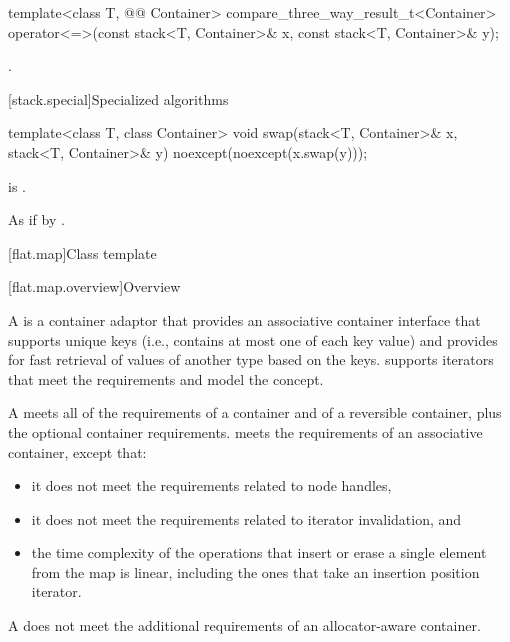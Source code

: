 %
\begin{itemdecl}
template<class T, @@ Container>
  compare_three_way_result_t<Container>
    operator<=>(const stack<T, Container>& x, const stack<T, Container>& y);
\end{itemdecl}

\begin{itemdescr}
\pnum
\returns
{}.
\end{itemdescr}

[stack.special]{Specialized algorithms}

%
\begin{itemdecl}
template<class T, class Container>
  void swap(stack<T, Container>& x, stack<T, Container>& y) noexcept(noexcept(x.swap(y)));
\end{itemdecl}

\begin{itemdescr}
\pnum
\constraints
{} is .

\pnum
\effects
As if by .
\end{itemdescr}

[flat.map]{Class template }

[flat.map.overview]{Overview}

\pnum
{}%
A  is a container adaptor
that provides an associative container interface
that supports unique keys
(i.e., contains at most one of each key value) and
provides for fast retrieval of values of another type 
based on the keys.
 supports iterators
that meet the  requirements and
model the
 concept.

\pnum
A  meets all of the requirements
of a container and
of a reversible container,
plus the optional container requirements.
 meets the requirements of
an associative container,
except that:
\begin{itemize}
\item
it does not meet the requirements related to node handles,
\item
it does not meet the requirements related to iterator invalidation, and
\item
the time complexity of the operations that insert or erase a single
element from the map is linear, including the ones that take an insertion
position iterator.
\end{itemize}
\begin{note}
A  does not meet the additional requirements of
an allocator-aware container.
\end{note}


